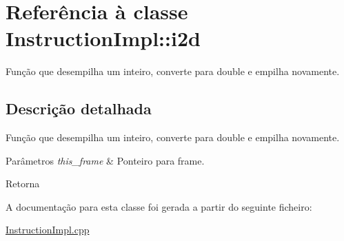 \hypertarget{class_instruction_impl_1_1i2d}{}\section{Referência à classe Instruction\+Impl\+:\+:i2d}
\label{class_instruction_impl_1_1i2d}


Função que desempilha um inteiro, converte para double e empilha novamente.  




\subsection{Descrição detalhada}
Função que desempilha um inteiro, converte para double e empilha novamente. 


\begin{DoxyParams}{Parâmetros}
{\em this\+\_\+frame} & Ponteiro para frame. \\
\hline
\end{DoxyParams}
\begin{DoxyReturn}{Retorna}

\end{DoxyReturn}


A documentação para esta classe foi gerada a partir do seguinte ficheiro\+:\begin{DoxyCompactItemize}
\item 
\hyperlink{_instruction_impl_8cpp}{Instruction\+Impl.\+cpp}\end{DoxyCompactItemize}
